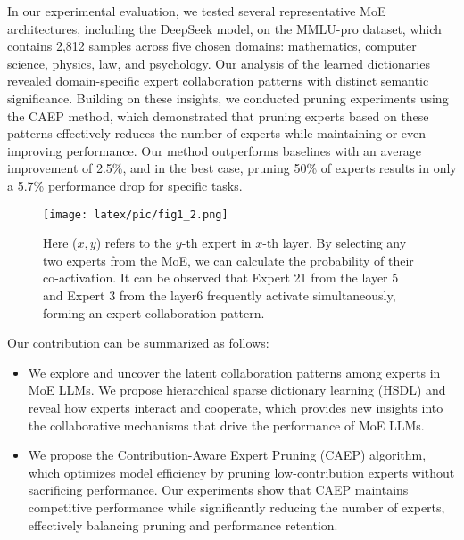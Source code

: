 \documentclass[11pt]{article}
\begin{document}

In our experimental evaluation, we tested several representative MoE architectures, including the DeepSeek model, on the MMLU-pro dataset, which contains 2,812 samples across five chosen domains: mathematics, computer science, physics, law, and psychology. Our analysis of the learned dictionaries revealed domain-specific expert collaboration patterns with distinct semantic significance. Building on these insights, we conducted pruning experiments using the CAEP method, which demonstrated that pruning experts based on these patterns effectively reduces the number of experts while maintaining or even improving performance. Our method outperforms baselines with an average improvement of 2.5\%, and in the best case, pruning 50\% of experts results in only a 5.7\% performance drop for specific tasks.


\begin{figure}[t]
    \centering
    \texttt{[image: latex/pic/fig1\_2.png]}
    \caption{Here ($x,y$) refers to the $y$-th expert in $x$-th layer.  By selecting any two experts from the MoE, we can calculate the probability of their co-activation.  It can be observed that Expert 21 from the layer 5 and Expert 3 from the layer6 frequently activate simultaneously, forming an expert collaboration pattern.}
    \label{fig:introduction_2}
\end{figure}
\setlength{\belowcaptionskip}{-0.3cm} %

Our contribution can be summarized as follows:
\begin{itemize}[itemsep=-0.03em, parsep=-0.0pt]
    \item We explore and uncover the latent collaboration patterns among experts in MoE LLMs. We propose hierarchical sparse dictionary learning (HSDL) and reveal how experts interact and cooperate, which provides new insights into the collaborative mechanisms that drive the performance of MoE LLMs.

    \item We propose the Contribution-Aware Expert Pruning (CAEP) algorithm, which optimizes model efficiency by pruning low-contribution experts without sacrificing performance. Our experiments show that CAEP maintains competitive performance while significantly reducing the number of experts, effectively balancing pruning and performance retention.


\end{itemize}
\end{document}
